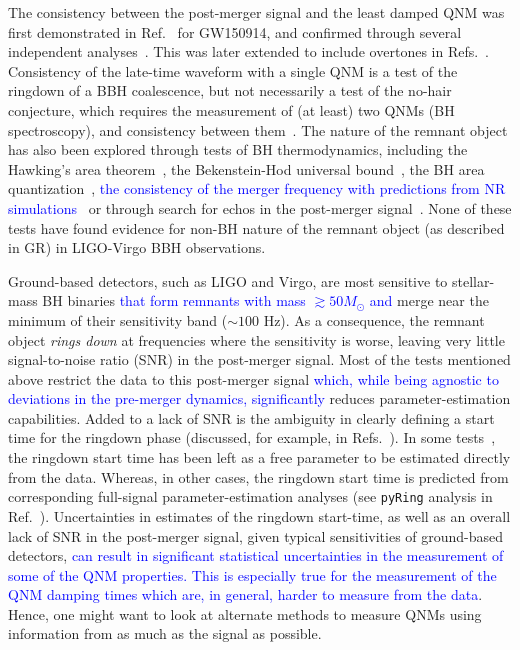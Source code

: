 \documentclass[twocolumn,prd,aps,superscriptaddress,preprintnumbers,tightenlines,showpacs,nofootinbib,eqsecnum,amsfonts,amsmath]{revtex4-1}
\newcommand{\rb}[1]{\textcolor{blue}{#1}}
\begin{document}
The consistency between the post-merger signal and the least damped QNM was first demonstrated in
Ref.~\cite{TheLIGOScientific:2016src} for GW150914, and confirmed through several independent analyses~\cite{Brito:2018rfr,Carullo:2019flw,Isi:2019aib,CalderonBustillo:2020tjf}. This was later extended to include
overtones in Refs.~\cite{Giesler:2019uxc,Isi:2019aib,Abbott:2020jks}. Consistency of the late-time waveform with a single QNM is a test of the ringdown of
a BBH coalescence, but not necessarily a test of the no-hair
conjecture, which requires the measurement of (at least) two QNMs (BH
spectroscopy), and consistency between them~\cite{Dreyer:2003bv,Gossan:2011ha, Meidam:2014jpa,Carullo:2018sfu,Carullo:2018gah,Isi:2019aib,Bhagwat:2019bwv,Cabero:2019zyt,Maselli:2019mjd}. The nature of the remnant object has also been explored through tests of BH thermodynamics, including the Hawking's area
theorem~\cite{Cabero:2017avf,Isi:2020tac}, the Bekenstein-Hod universal bound~\cite{Carullo:2021yxh}, the BH area quantization~\cite{Foit:2016uxn,Laghi:2020rgl}, \rb{the consistency of the merger frequency with predictions from NR simulations~\cite{Carullo:2018gah}} or through search for echos in the post-merger signal~\cite{Nielsen:2018lkf,Tsang:2019zra,Lo:2018sep,Abedi:2018npz,Abedi:2020sgg,Testa:2018bzd}.  None of these tests have found evidence for non-BH nature of the remnant
object (as described in GR) in LIGO-Virgo BBH observations.

Ground-based detectors, such as LIGO and Virgo, are most sensitive to
stellar-mass BH binaries \rb{that form remnants with mass $\gtrsim 50 M_{\odot}$ and} merge near the
minimum of their sensitivity band ($\sim 100$ Hz). As a consequence, the
remnant object \textit{rings down} at frequencies where the sensitivity is worse, leaving
very little signal-to-noise ratio (SNR) in the
post-merger signal. Most of the tests mentioned above restrict the data to this post-merger signal \rb{which, while being agnostic to deviations in the pre-merger dynamics, significantly} reduces parameter-estimation capabilities. Added to a lack of SNR is the ambiguity in clearly defining a start time for the ringdown phase (discussed, for example, in Refs.~\cite{Berti:2007fi,Baibhav:2017jhs,Bhagwat:2017tkm}). In some tests~\cite{Carullo:2018gah,Carullo:2019flw}, the ringdown start time has been left as a
free parameter to be estimated directly from the data. Whereas, in other cases, the ringdown start time is predicted from corresponding full-signal parameter-estimation analyses (see \texttt{pyRing} analysis in Ref.~\cite{Abbott:2020jks}). Uncertainties
in estimates of the ringdown start-time, as well as an overall lack of
SNR in the post-merger signal, given typical sensitivities of
ground-based detectors, \rb{can result in significant statistical uncertainties in the measurement of some of the QNM properties. This is especially true for the measurement of the QNM damping times which are, in general, harder to measure from the data}. Hence, one might want to look at alternate methods to measure QNMs using information from as much as the signal as possible.
\end{document}
